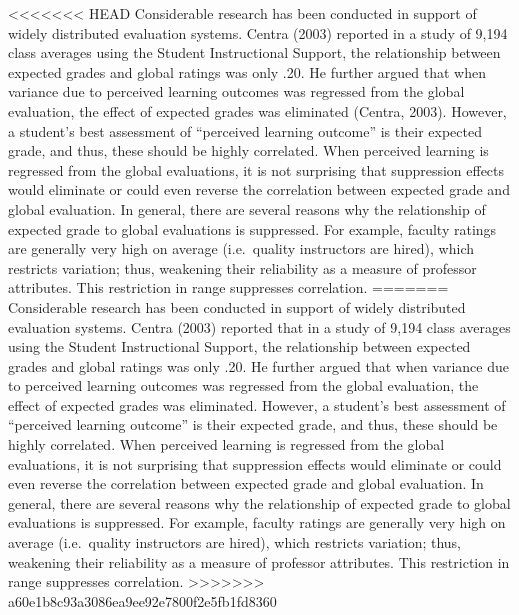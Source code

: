 \documentclass[man]{apa6}
\theoremstyle{definition}
\theoremstyle{definition}
\theoremstyle{definition}
\theoremstyle{remark}
\begin{document}
\textless{}\textless{}\textless{}\textless{}\textless{}\textless{}\textless{}
HEAD Considerable research has been conducted in support of widely
distributed evaluation systems. Centra (2003) reported in a study of
9,194 class averages using the Student Instructional Support, the
relationship between expected grades and global ratings was only .20. He
further argued that when variance due to perceived learning outcomes was
regressed from the global evaluation, the effect of expected grades was
eliminated (Centra, 2003). However, a student's best assessment of
\enquote{perceived learning outcome} is their expected grade, and thus,
these should be highly correlated. When perceived learning is regressed
from the global evaluations, it is not surprising that suppression
effects would eliminate or could even reverse the correlation between
expected grade and global evaluation. In general, there are several
reasons why the relationship of expected grade to global evaluations is
suppressed. For example, faculty ratings are generally very high on
average (i.e.~quality instructors are hired), which restricts variation;
thus, weakening their reliability as a measure of professor attributes.
This restriction in range suppresses correlation. ======= Considerable
research has been conducted in support of widely distributed evaluation
systems. Centra (2003) reported that in a study of 9,194 class averages
using the Student Instructional Support, the relationship between
expected grades and global ratings was only .20. He further argued that
when variance due to perceived learning outcomes was regressed from the
global evaluation, the effect of expected grades was eliminated.
However, a student's best assessment of \enquote{perceived learning
outcome} is their expected grade, and thus, these should be highly
correlated. When perceived learning is regressed from the global
evaluations, it is not surprising that suppression effects would
eliminate or could even reverse the correlation between expected grade
and global evaluation. In general, there are several reasons why the
relationship of expected grade to global evaluations is suppressed. For
example, faculty ratings are generally very high on average
(i.e.~quality instructors are hired), which restricts variation; thus,
weakening their reliability as a measure of professor attributes. This
restriction in range suppresses correlation.
\textgreater{}\textgreater{}\textgreater{}\textgreater{}\textgreater{}\textgreater{}\textgreater{}
a60e1b8c93a3086ea9ee92e7800f2e5fb1fd8360
\end{document}
